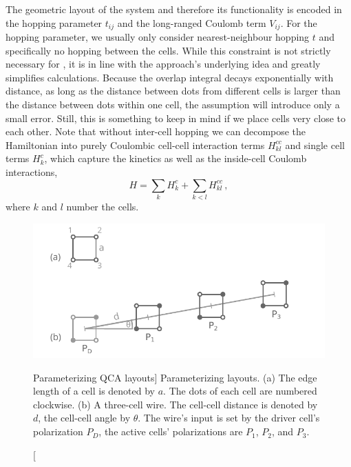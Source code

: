The geometric layout of the  system and therefore its functionality is
encoded in the hopping parameter $t_{ij}$ and the long-ranged Coulomb term
$V_{ij}$. For the hopping parameter, we usually only consider nearest-neighbour
hopping $t$ and specifically no hopping between the cells. While this constraint
is not strictly necessary for , it is in line with the approach's
underlying idea and greatly simplifies calculations. Because the overlap
integral decays exponentially with distance, as long as the distance between
dots from different cells is larger than the distance between dots within one
cell, the assumption will introduce only a small error. Still, this is something
to keep in mind if we place cells very close to each other. Note that without
inter-cell hopping we can decompose the Hamiltonian into purely Coulombic
cell-cell interaction terms $H^{cc}_{kl}$ and single cell terms $H^c_k$, which
capture the kinetics as well as the inside-cell Coulomb interactions,
\begin{equation}
  \label{eq:H_cell}
  H = \sum_k H^c_k + \sum_{k<l} H^{cc}_{kl} \, ,
\end{equation}
where $k$ and $l$ number the cells. 

\begin{figure}
  \center
  \includegraphics{short_wire}
  \caption
  [Parameterizing QCA layouts]
  {Parameterizing  layouts. (a) The edge length of a  cell is
  denoted by $a$. The dots of each cell are numbered clockwise. (b) A
  three-cell wire. The cell-cell distance is denoted by $d$, the cell-cell angle
  by $\theta$. The wire's input is set by the driver cell's polarization $P_D$,
  the active cells' polarizations are $P_1$, $P_2$, and $P_3$.}
  \label{fig:short_wire}
\end{figure}

